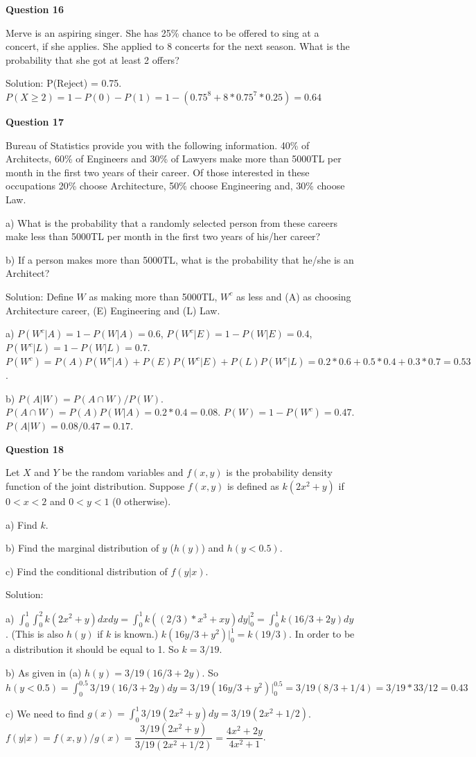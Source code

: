 \documentclass[]{book}
\theoremstyle{definition}
\theoremstyle{definition}
\theoremstyle{definition}
\theoremstyle{remark}
\begin{document}
\textbf{Question 16}

Merve is an aspiring singer. She has 25\% chance to be offered to sing
at a concert, if she applies. She applied to 8 concerts for the next
season. What is the probability that she got at least 2 offers?

Solution: P(Reject) = 0.75.
\(P(X \ge 2) = 1 - P(0) - P(1) = 1 - (0.75^8 + 8*0.75^7*0.25) = 0.64\)

\textbf{Question 17}

Bureau of Statistics provide you with the following information. 40\% of
Architects, 60\% of Engineers and 30\% of Lawyers make more than 5000TL
per month in the first two years of their career. Of those interested in
these occupations 20\% choose Architecture, 50\% choose Engineering and,
30\% choose Law.

a) What is the probability that a randomly selected person from these
careers make less than 5000TL per month in the first two years of
his/her career?

b) If a person makes more than 5000TL, what is the probability that
he/she is an Architect?

Solution: Define \(W\) as making more than 5000TL, \(W^c\) as less and
(A) as choosing Architecture career, (E) Engineering and (L) Law.

a) \(P(W^c|A) = 1 - P(W|A) = 0.6\), \(P(W^c|E) = 1 - P(W|E) = 0.4\),
\(P(W^c|L) = 1 - P(W|L) = 0.7\).
\(P(W^c) = P(A)P(W^c|A)+P(E)P(W^c|E)+P(L)P(W^c|L) = 0.2*0.6+0.5*0.4+0.3*0.7 = 0.53\).

b) \(P(A|W) = P(A \cap W)/P(W)\).
\(P(A \cap W) = P(A)P(W|A) = 0.2*0.4 = 0.08\).
\(P(W) = 1 - P(W^c) = 0.47\). \(P(A|W) = 0.08/0.47 = 0.17\).

\textbf{Question 18}

Let \(X\) and \(Y\) be the random variables and \(f(x,y)\) is the
probability density function of the joint distribution. Suppose
\(f(x,y)\) is defined as \(k(2x^2 + y)\) if \(0<x<2\) and \(0<y<1\) (0
otherwise).

a) Find \(k\).

b) Find the marginal distribution of \(y\) (\(h(y)\)) and \(h(y<0.5)\).

c) Find the conditional distribution of \(f(y|x)\).

Solution:

a)
\(\int^1_0 \int^2_0 k(2x^2 + y) dx dy = \int^1_0 k((2/3)*x^3 + xy)dy|^2_0 = \int^1_0 k(16/3+2y) dy\).
(This is also \(h(y)\) if \(k\) is known.)
\(k(16y/3+y^2)|^1_0 = k(19/3)\). In order to be a distribution it should
be equal to 1. So \(k = 3/19\).

b) As given in (a) \(h(y) = 3/19(16/3+2y)\). So
\(h(y<0.5) = \int^{0.5}_0 3/19(16/3+2y) dy = 3/19(16y/3+y^2)|^{0.5}_0 = 3/19(8/3 + 1/4) = 3/19*33/12 = 0.43\)

c) We need to find
\(g(x) = \int^1_0 3/19(2x^2 + y)dy = 3/19(2x^2 + 1/2)\).
\(f(y|x) = f(x,y)/g(x) = \dfrac{3/19(2x^2+y)}{3/19(2x^2 + 1/2)} = \dfrac{4x^2 + 2y}{4x^2 + 1}\).


\end{document}
